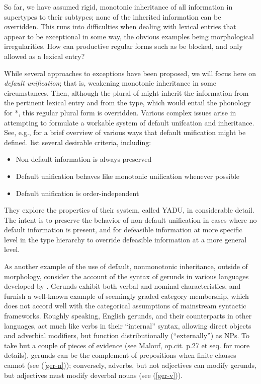 \documentclass[output=paper]{langsci/langscibook}
\begin{document}
So far, we have assumed rigid, monotonic inheritance of all information in supertypes to their subtypes; none of the inherited information can be overridden.
This runs into difficulties when dealing with lexical entries that appear to be exceptional in some way, the obvious examples being morphological irregularities.
How can productive regular forms such as  be blocked, and only  allowed as a lexical entry?

While several approaches to exceptions have been proposed, we will focus here on \emph{default unification}; that is, weakening monotonic inheritance in some circumstances.
Then, although the plural of  might inherit the information from the pertinent lexical entry and from the  type, which would entail the phonology for *, this regular plural form is overridden.
Various complex issues arise in attempting to formulate a workable system of default unifcation and inheritance.
See, e.g., \citet{BriscoeandCopestake1999} for a brief overview of various ways that default unification might be defined.
\citet{LC99a} list several desirable criteria, including:

\begin{itemize}
	\item Non-default information is always preserved
	\item Default unification behaves like monotonic unification whenever possible
	\item Default unification is order-independent
\end{itemize}

They explore the properties of their system, called YADU, in considerable detail.
The intent is to preserve the behavior of non-default unification in cases where no default information is present, and for defeasible information at more specific level in the type hierarchy to override defeasible information at a more general level.

As another example of the use of default, nonmonotonic inheritance, outside of morphology, consider the account of the syntax of gerunds in various languages developed by \citet{Malouf2000b}.
Gerunds exhibit both verbal and nominal characteristics, and furnish a well-known example of seemingly graded category membership, which does not accord well with the categorical assumptions of mainstream syntactic frameworks.
Roughly speaking, English gerunds, and their counterparts in other languages, act much like verbs in their ``internal'' syntax, allowing direct objects and adverbial modifiers, but function distributionally (``externally'') as NPs. To take but a couple of pieces of evidence (see Malouf, op.cit. p.27 et seq. for more details), gerunds can be the complement of prepositions when finite clauses cannot (see (\ref{ger-n})); conversely, adverbs, but not adjectives can modify gerunds, but adjectives must modify deverbal nouns (see (\ref{ger-v})).
\end{document}
